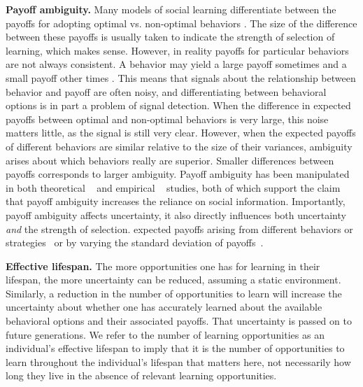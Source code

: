 \documentclass[letterpaper,11.5pt]{scrartcl}
\begin{document}
\textbf{Payoff ambiguity.} Many models of social learning differentiate between
the payoffs for adopting optimal vs. non-optimal behaviors
\cite{Rogers1988,Enquist2007,Rendell2010}. The size of the difference between
these payoffs is usually taken to indicate the strength of selection of learning,
which makes sense. However, in reality payoffs for particular behaviors are not
always consistent. A behavior may yield a large payoff sometimes and a small
payoff other times \cite{McElreath2005}. This means that signals about the
relationship between behavior and payoff are often noisy, and differentiating
between behavioral options is in part a problem of signal detection.  When the
difference in expected payoffs between optimal and non-optimal behaviors is very
large, this noise matters little, as the signal is still very clear. However, when
the expected payoffs of different behaviors are similar relative to the size of
their variances, ambiguity arises about which behaviors really are superior.
Smaller differences between payoffs corresponds to larger ambiguity. Payoff
ambiguity has been manipulated in both theoretical ~\cite{perreault2012bayesian}
and empirical ~\cite{McElreath2005, Morgan2012} studies, both of which support the
claim that payoff ambiguity increases the reliance on social information.
Importantly, payoff ambiguity %
affects uncertainty, it also directly influences both uncertainty \emph{and} the
strength of selection. %
expected payoffs arising from different behaviors or
strategies~\cite{Enquist2007,Rendell2010} or by varying the standard deviation of
payoffs~\cite{McElreath2005}. 

\textbf{Effective lifespan.} 
The more opportunities one has for
learning in their lifespan, the more uncertainty can be reduced, assuming a
static environment. Similarly, a reduction in the number
of opportunities to learn will increase the uncertainty about whether one has
accurately learned about the available behavioral options and their associated
payoffs. That uncertainty is passed on to future generations.
We refer to the number of learning opportunities as an individual's
effective lifespan to imply that it is the number of opportunities to learn
throughout the individual's lifespan that matters here, not necessarily how long
they live in the absence of relevant learning opportunities.  
\end{document}
